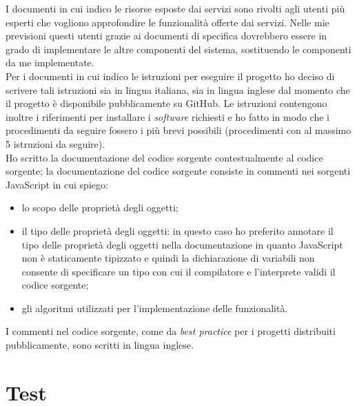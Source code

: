 I documenti in cui indico le risorse esposte dai servizi sono rivolti agli utenti più esperti che vogliono approfondire le funzionalità offerte dai servizi. Nelle mie previsioni questi utenti grazie ai documenti di specifica dovrebbero essere in grado di implementare le altre componenti del sistema, sostituendo le componenti da me implementate.\\
Per i documenti in cui indico le istruzioni per eseguire il progetto ho deciso di scrivere tali istruzioni sia in lingua italiana, sia in lingua inglese dal momento che il progetto è disponibile pubblicamente su GitHub. Le istruzioni contengono inoltre i riferimenti per installare i \emph{software} richiesti e ho fatto in modo che i procedimenti da seguire fossero i più brevi possibili (procedimenti con al massimo 5 istruzioni da seguire).\\
Ho scritto la documentazione del codice sorgente contestualmente al codice sorgente; la documentazione del codice sorgente consiste in commenti nei sorgenti JavaScript in cui spiego:
\begin{itemize}
	\item lo scopo delle proprietà degli oggetti;
	\item il tipo delle proprietà degli oggetti: in questo caso ho preferito annotare il tipo delle proprietà degli oggetti nella documentazione in quanto JavaScript non è staticamente tipizzato e quindi la dichiarazione di variabili non consente di specificare un tipo con cui il compilatore e l'interprete validi il codice sorgente;
	\item gli algoritmi utilizzati per l'implementazione delle funzionalità.
\end{itemize}
I commenti nel codice sorgente, come da \emph{best practice} per i progetti distribuiti pubblicamente, sono scritti in lingua inglese.

\newpage

\section{Test}

